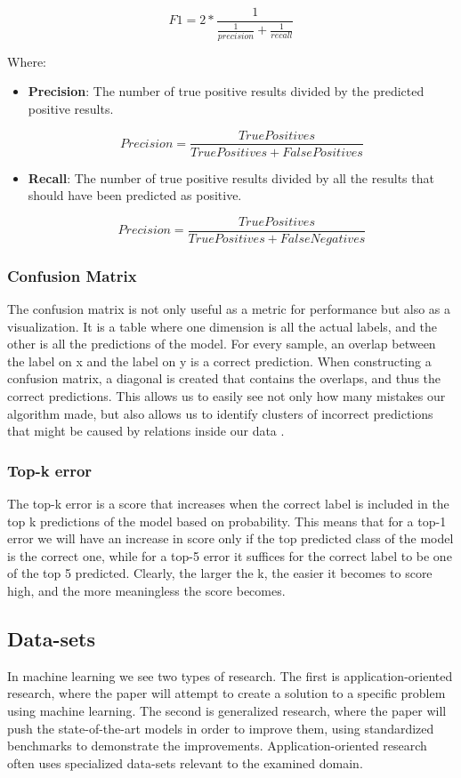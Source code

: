 \documentclass[10pt,twocolumn,letterpaper]{article}
\begin{document}
\[
    {F1} = 2 * \frac{1}{\frac{1}{precision} + \frac{1}{recall}}
\]

\noindent Where:
\begin{itemize}[leftmargin=*]
    \item \textbf{Precision}: The number of true positive results divided by the predicted positive results.
    
    \[
    {Precision} = \frac{True Positives}{{True Positives} + {False Positives}}
    \]
    
    \item \textbf{Recall}: The number of true positive results divided by all the results that should have been predicted as positive.
    
    \[
    {Precision} = \frac{True Positives}{{True Positives} + {False Negatives}}
    \]
\end{itemize}

\subsubsection{Confusion Matrix}
 The confusion matrix is not only useful as a metric for performance but also as a visualization. It is a table where one dimension is all the actual labels, and the other is all the predictions of the model. For every sample, an overlap between the label on x and the label on y is a correct prediction. When constructing a confusion matrix, a diagonal is created that contains the overlaps, and thus the correct predictions. This allows us to easily see not only how many mistakes our algorithm made, but also allows us to identify clusters of incorrect predictions that might be caused by relations inside our data \cite{iba_deep_2020}.
 
\subsubsection{Top-k error}
The top-k error is a score that increases when the correct label is included in the top k predictions of the model based on probability. This means that for a top-1 error we will have an increase in score only if the top predicted class of the model is the correct one, while for a top-5 error it suffices for the correct label to be one of the top 5 predicted. Clearly, the larger the k, the easier it becomes to score high, and the more meaningless the score becomes.

\subsection{Data-sets}
In machine learning we see two types of research. The first is application-oriented research, where the paper will attempt to create a solution to a specific problem using machine learning. The second is generalized research, where the paper will push the state-of-the-art models in order to improve them, using standardized benchmarks to demonstrate the improvements. Application-oriented research often uses specialized data-sets relevant to the examined domain.
\end{document}
